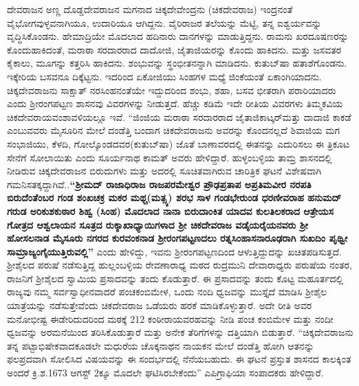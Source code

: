 ದೇವರಾಜನ ಅಣ್ಣ ದೊಡ್ಡದೇವರಾಜನ ಮಗನಾದ ಚಿಕ್ಕದೇವೇಂದ್ರನು (ಚಿಕದೇವರಾಜ) ಇಂದ್ರನಂತೆ ವೈಭೋಗ\-ವುಳ್ಳವನಾಗಿಯೂ, ಉದಾರಿಯೂ ಆಗಿದ್ದನು. ವೈರಿರಾಜರ ತಲೆಯನ್ನು ಮೆಟ್ಟಿ, ತನ್ನ ಐಶ್ವರ್ಯವನ್ನು ವೃದ್ಧಿಸಿಕೊಂಡನು. ಹೇಮಾದ್ರಿಯೇ ಮೊದಲಾದ ಹದಿನಾರು ದಾನಗಳನ್ನು ಮಾಡುತ್ತಿದ್ದನು. ರಾಮನು ಖರದೂಷಣರನ್ನು ಕೊಂದುಹಾಕಿದಂತೆ, ಮರಾಠಾ ಸರದಾರರಾದ ದಾದೋಜಿ, ಜೈತಾಜಿಯರನ್ನು ಕೊಂದು ಹಾಕಿದನು. ಮತ್ತು ಜಸವತರ ಕೈಕಾಲು, ಮೂಗನ್ನು ಕತ್ತರಿಸಿ ಹಾಕಿದನು. ಶಂಭುವನ್ನು ಸ್ಥಂಭೀತನನ್ನಾಗಿ ಮಾಡಿದನು. ಕುತುಬ್​ಷಾ ಹತಾಶೆಗೊಂಡನು. ಇಕ್ಕೇರಿಯ ಬಸವನೂ ದಿಕ್ಕೆಟ್ಟನು. ಇದರಿಂದ ಏಕೋಜಿಯು ಸಿಂಹಗಳ ಮಧ್ಯೆ ಜಿಂಕೆಯಂತೆ ಏಕಾಂಗಿಯಾದನು. ಚಿಕ್ಕದೇವರಾಜನು ಸಾಕ್ಷಾತ್​ ನರಸಿಂಹನಂತೆಯೇ ಇದ್ದುದರಿಂದ ಶಂಭು, ಶಹಾ, ಬಸವ ಭೀತರಾಗಿ ಪರಾರಿಯಾದರು ಎಂದು ಶ‍್ರೀರಂಗಪಟ್ಟಣ ಶಾಸನವು ವಿವರಗಳನ್ನು ನೀಡುತ್ತದೆ. ಹೆಚ್ಚು ಕಡಿಮೆ ಇದೇ ರೀತಿಯ ವಿವರಗಳು ತಿಮ್ಮಕವಿಯ ಚಿಕದೇವರಾಯವಂಶಾವಳಿಯಲ್ಲೂ ಇವೆ. “ಜಿಂಜಿಯ ಮರಾಠಾ ಸರದಾರರಾದ ಜೈತಾಜಿಕಾಟ್ಕರ್​ ಮತ್ತು ದಾದಾಜಿ ಕಾಕಡೆ ಎಂಬುವವರು ಮೈಸೂರಿನ ಮೇಲೆ ದಂಡೆತ್ತಿ ಬಂದಾಗ ಚಿಕದೇವರಾಜನು ಅವರನ್ನು ಕೊಂದನಲ್ಲದೆ ಶಿವಾಜಿಯ ಮಗ ಸಂಭಾಜಿಯು, ಕೆಳದಿ, ಗೋಲ್ಕೊಂಡದವರ\break (ಕುತುಬ್​ಷಾ) ಜೊತೆ ಬಾಣಾವರದಲ್ಲಿ ಈತನನ್ನು ಎದುರಿಸಲು ಈ ತ್ರಿಕೂಟ ಸೇನೆಗೆ ಸೋಲಾಯಿತು ಎಂದು ಸೂರ್ಯನಾಥ ಕಾಮತ್​ ಅವರು ಹೇಳಿದ್ದಾರೆ. ಹುಳ್ಳಂಬಳ್ಳಿಯ ತಾಮ್ರ ಶಾಸನದಲ್ಲಿ ನೀಡಿರುವ ಚಿಕ್ಕದೇವರಾಜನ ಬಿರುದುಗಳು ಮತ್ತು ಅದರಲ್ಲಿ ಸೂಚಿತವಾಗಿರುವ ಚಾರಿತ್ರಿಕ ಘಟನೆ ವಿಶೇಷವಾಗಿ ಗಮನಿಸತಕ್ಕದ್ದಾಗಿವೆ..\textbf{“ಶ‍್ರೀಮದ್​ ರಾಜಾಧಿರಾಜ ರಾಜಪರಮೇಶ್ವರ ಪ್ರೌಢಪ್ರತಾಪ ಅಪ್ರತಿಮವೀರ ನರಪತಿ ಬಿರುದೆಂತೆಂಬರ ಗಂಡ ಶಂಖಚಕ್ರ ಮಕರ ಮಥ್ಚ(ಮತ್ಸ್ಯ) ಶರಭ ಸಾಳ ಗಂಡಭೇರುಂಡ ಧರಣೀವರಾಹ ಹನುಮದ್​ಗರುಡ ಅರಿಕುಶಕುಠಾರ ಶಿಹ್ವ (ಸಿಂಹ) ಮೊದಲಾದ ನಾನಾ ಬಿರುದಾಂಕಿತ ಯಾದವ ಕುಲತಿಲಕರಾದ ಆತ್ರೇಯಸ ಗೋತ್ರದ ಆಶ್ವಲಾಯನ ಸೂತ್ರದ ರುಕ್ಶಾಖಾಧ್ಯಾಯಿಗಳಾದ ಶ‍್ರೀ ಚಿಕದೇವರಾಜ ವಡೈಯರೈಯನವರು ಶ‍್ರೀ ಹೋಸಲನಾಡ ಮೈಸೂರು ನಗರದ ಕುರವಂಕನಾಡ ಶ‍್ರೀರಂಗಪಟ್ಟಣದಲು ರತ್ನಸಿಂಹಾಸನಾರೂಢರಾಗಿ ಸುಖದಿಂ ಪೃಥ್ವೀ ಸಾಮ್ರಾಜ್ಯಂಗೈಯುತ್ತಿರುವಲ್ಲಿ”} ಎಂದು ಹೇಳಿದ್ದು, ಇವನು ಶ‍್ರೀರಂಗಪಟ್ಟಣದಿಂದ ಆಳುತ್ತಿದ್ದುದನ್ನು ಖಚಿತಪಡಿಸುತ್ತದೆ. ಶ‍್ರೀಶೈಲದ ಪರುಷೆ ನಡೆಸುತ್ತಿದ್ದ ಹುಲ್ಲಂಬಳ್ಳಿಯ ರೇವಣಾರಾಧ್ಯ ಮಠದ ರುದ್ರಮುನಿ ದೇವಾರಾಧ್ಯರು ಪರುಷೆಯ ನಂತರ, ರಾಜನಿಗೆ ಶ‍್ರೀಶೈಲದ ಸ್ವಾಮಿಯ ಪ್ರಸಾದವನ್ನು ತಂದು ಕೊಡುತ್ತಾರೆ. ಈ ಪ್ರಸಾದವನ್ನು ತಂದು ಕೊಟ್ಟ ಮಹೂರ್ತದಲ್ಲಿ ರಾಜ್ಯವು ನಮ್ಮ ಸರ್ವಸ್ವಾಧೀನವಾದರೆ ಪಂಚಕಂಬಿಮೇಳ, ಒಂದು ನಂದಿ ಧ್ವಜವನ್ನು ಮುಸ್ತೈದೆ ಮಾಡಿಸಿ ಶ‍್ರೀಶೈಲ ಯಾತ್ರೆಯನ್ನು ನಡೆಸುತ್ತೇವೆಂದು ಚಿಕದೇವರಾಜ ಒಡೆಯರು ಹರಕೆ ಮಾಡಿಕೊಳ್ಳುತ್ತಾರೆ. ಅದೇ ರೀತಿ ಅವರ ಮನೋಭೀಷ್ಟ ಈಡೇರಿದುದರಿಂದ ಮಠಕ್ಕೆ 212 ಕಂಠೀರಾಯವರಹವನ್ನು ನೀಡಿ ಪಂಚ ಕಂಬಿಮೇಳ ಮತ್ತು ನಂದೀ ಧ್ವಜವನ್ನು ಅರಮನೆಯಿಂದ ತರಿಸಿಕೊಡುತ್ತಾರೆ ಮತ್ತು ಅನೇಕ ತೆರಿಗೆಗಳನ್ನು ದತ್ತಿಯಾಗಿ ಬಿಡುತ್ತಾರೆ. “ಚಿಕ್ಕದೇವರಾಜನು ತನ್ನ ಪಟ್ಟಾಭಿಷೇಕವಾದಕೂಡಲೇ ಮಧುರೆಯ ಚೊಕ್ಕನಾಥನ ನಾಯಕನ ಮೇಲೆ ದಂಡೆತ್ತಿ ಹೋಗಿ ಆತನನ್ನು ಫಲಪ್ರದವಾಗಿ ಸೋಲಿಸಿದ ವಿಷಯವನ್ನು ಈ ಸಂದರ್ಭದಲ್ಲಿ ನೆನೆಯಬಹುದು. ಈ ಘಟನೆ ಪ್ರಸ್ತುತ ಶಾಸನದ ಕಾಲಕ್ಕಿಂತ ಅಂದರೆ ಕ್ರಿ.ಶ.1673 ಆಗಸ್ಟ್​ 2ಕ್ಕೂ ಮೊದಲೇ ಘಟಿಸಿರಬೇಕೆಂದು” ಎಪಿಗ್ರಾಫಿಯಾ ಸಂಪಾದಕರು ಹೇಳಿದ್ದಾರೆ.

